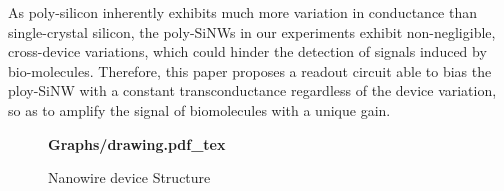 \documentclass{article}
\begin{document}
As poly-silicon inherently exhibits much more variation in conductance than single-crystal silicon,
the poly-SiNWs in our experiments exhibit non-negligible, cross-device variations,
which could hinder the detection of signals induced by bio-molecules.
Therefore, this paper proposes a readout circuit able to bias the ploy-SiNW with a constant
transconductance regardless of the device variation,
so as to amplify the signal of biomolecules with a unique gain.

\begin{figure}
    \centering
    {\selectfont\textbf{
        \def\svgwidth{5.0cm}
        \fontsize{6}{7}\selectfont
         {Graphs/drawing.pdf_tex}
    }}
    \caption{Nanowire device Structure}
    \label{fig:draw}
\end{figure}
\end{document}
